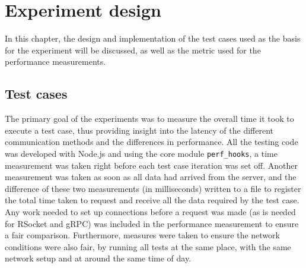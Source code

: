 \chapter{Experiment design}
In this chapter, the design and implementation of the test cases used as the basis for the experiment will be discussed, as well as the metric used for the performance measurements.

\section{Test cases}
The primary goal of the experiments was to measure the overall time it took to execute a test case, thus providing insight into the latency of the different communication methods and the differences in performance. All the testing code was developed with Node.js and using the core module \texttt{perf\_hooks}, a time measurement was taken right before each test case iteration was set off. Another measurement was taken as soon as all data had arrived from the server, and the difference of these two measurements (in milliseconds) written to a file to register the total time taken to request and receive all the data required by the test case. Any work needed to set up connections before a request was made (as is needed for RSocket and gRPC) was included in the performance measurement to ensure a fair comparison. Furthermore, measures were taken to ensure the network conditions were also fair, by running all tests at the same place, with the same network setup and at around the same time of day.

